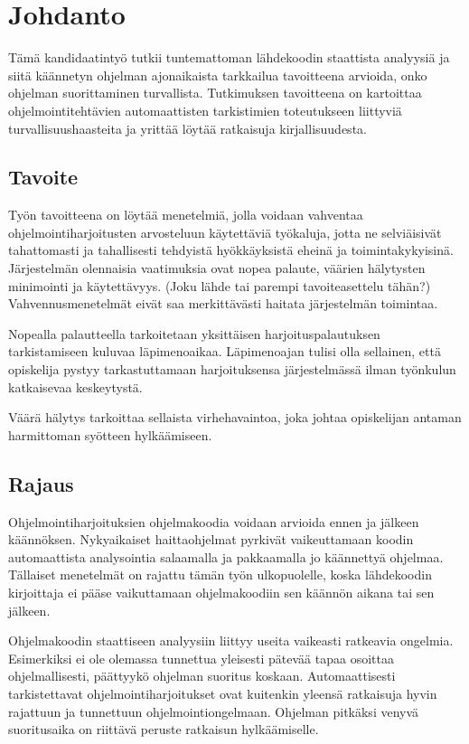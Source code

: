 

\section{Johdanto}
\label{sec:johd}

Tämä kandidaatintyö tutkii tuntemattoman lähdekoodin staattista
analyysiä ja siitä käännetyn ohjelman ajonaikaista tarkkailua tavoitteena
arvioida, onko ohjelman suorittaminen turvallista. Tutkimuksen tavoitteena on
kartoittaa ohjelmointitehtävien automaattisten tarkistimien toteutukseen
liittyviä turvallisuushaasteita ja yrittää löytää ratkaisuja kirjallisuudesta.

\subsection{Tavoite}

Työn tavoitteena on löytää menetelmiä, jolla voidaan vahventaa
ohjelmointiharjoitusten arvosteluun käytettäviä työkaluja, jotta ne selviäisivät
tahattomasti ja tahallisesti tehdyistä hyökkäyksistä eheinä ja
toimintakykyisinä. Järjestelmän olennaisia vaatimuksia ovat nopea palaute,
väärien hälytysten minimointi ja käytettävyys. (Joku lähde tai parempi
tavoiteasettelu tähän?) Vahvennusmenetelmät eivät saa merkittävästi haitata
järjestelmän toimintaa.

Nopealla palautteella tarkoitetaan yksittäisen harjoituspalautuksen
tarkistamiseen kuluvaa läpimenoaikaa. Läpimenoajan tulisi olla sellainen, että
opiskelija pystyy tarkastuttamaan harjoituksensa järjestelmässä ilman työnkulun
katkaisevaa keskeytystä.

Väärä hälytys tarkoittaa sellaista virhehavaintoa, joka johtaa opiskelijan
antaman harmittoman syötteen hylkäämiseen.

\subsection{Rajaus}

Ohjelmointiharjoituksien ohjelmakoodia voidaan arvioida ennen ja jälkeen
käännöksen. Nykyaikaiset haittaohjelmat pyrkivät vaikeuttamaan koodin
automaattista analysointia salaamalla ja pakkaamalla jo käännettyä ohjelmaa.
Tällaiset menetelmät on rajattu tämän työn ulkopuolelle, koska lähdekoodin
kirjoittaja ei pääse vaikuttamaan ohjelmakoodiin sen käännön aikana tai sen
jälkeen.

Ohjelmakoodin staattiseen analyysiin liittyy useita vaikeasti ratkeavia
ongelmia. Esimerkiksi ei ole olemassa tunnettua yleisesti pätevää
tapaa osoittaa ohjelmallisesti, päättyykö ohjelman suoritus koskaan.
Automaattisesti tarkistettavat ohjelmointiharjoitukset ovat kuitenkin yleensä
ratkaisuja hyvin rajattuun ja tunnettuun ohjelmointiongelmaan. Ohjelman pitkäksi
venyvä suoritusaika on riittävä peruste ratkaisun hylkäämiselle.

